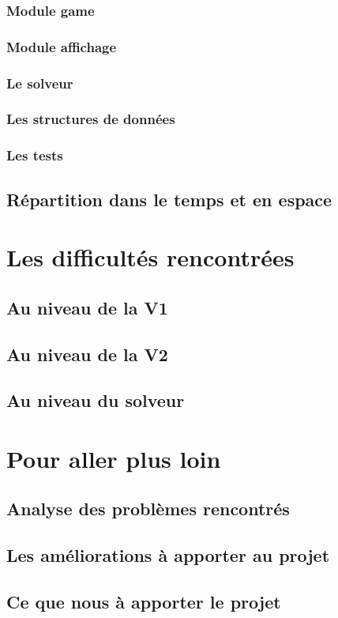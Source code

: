 \documentclass{report}
\begin{document}
\section{Module game}

\section{Module affichage}

\section{Le solveur}

\section{Les structures de données}

\section{Les tests}

\chapter{Répartition dans le temps et en espace}



\part{Les difficultés rencontrées}
\setcounter{chapter}{0}
\chapter{Au niveau de la V1}

\chapter{Au niveau de la V2}

\chapter{Au niveau du solveur}



\part{Pour aller plus loin}
\setcounter{chapter}{0}
\chapter{Analyse des problèmes rencontrés}

\chapter{Les améliorations à apporter au projet}

\chapter{Ce que nous à apporter le projet}
\end{document}
